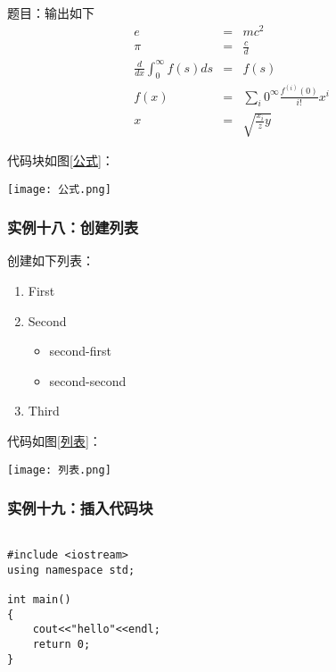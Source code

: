 \documentclass[a4paper]{article}
\begin{document}
题目：输出如下
\begin{eqnarray}
     e&=&mc^2 \\
     \pi&=&\frac{c}{d}\\
     \frac{d}{dx}\int_0^{\infty} f(s)ds&=&f(s)\\
     f(x)&=&\sum_{i} 0^{\infty}\frac{f^{(i)}(0)}{i!}x^i \\
     x&=&\sqrt{\frac{x_i}{z}y}
\end{eqnarray}

代码块如图\ref{公式}：
\begin{figure*}[!h]
    \centering
    \texttt{[image: 公式.png]}
    \caption{公式}
    \label{公式}
\end{figure*}

\subsubsection{实例十八：创建列表}
创建如下列表：
\begin{enumerate}
  \item First 
  \item Second 
\begin{itemize}
      \item second-first

      \item second-second
 \end{itemize}

  \item Third
\end{enumerate}
代码如图\ref{列表}：
\begin{figure*}[!h]
    \centering
    \texttt{[image: 列表.png]}
    \caption{列表}
    \label{列表}
\end{figure*}
\subsubsection{实例十九：插入代码块}
\begin{lstlisting}

#include <iostream>
using namespace std;

int main()
{
    cout<<"hello"<<endl;
    return 0;
}
\end{lstlisting}
\end{document}
